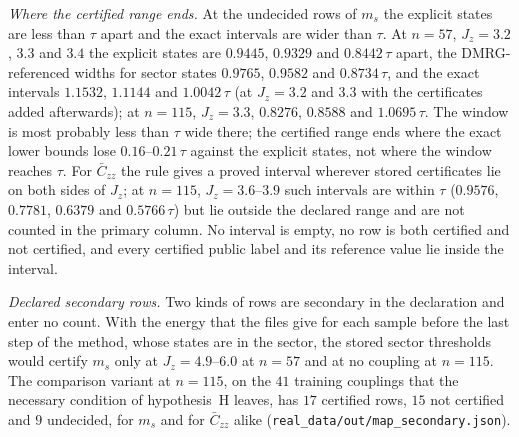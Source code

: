 \documentclass[aps,prx,onecolumn,10pt,nofootinbib,longbibliography,floatfix]{revtex4-2}
\theoremstyle{remark}
\newcommand{\Jz}{J_z}
\newcommand{\ms}{m_s}
\newcommand{\Czz}{\bar C_{zz}}
\begin{document}
\emph{Where the certified range ends.} At the undecided rows of $\ms$ the explicit states are less than $\tau$ apart
and the exact intervals are wider than $\tau$. At $n=57$, $\Jz=3.2$, $3.3$ and $3.4$ the explicit states %
are $0.9445$, $0.9329$ and $0.8442\,\tau$ apart, the DMRG-referenced widths for sector states $0.9765$, $0.9582$ and %
$0.8734\,\tau$, and the exact intervals $1.1532$, $1.1144$ and $1.0042\,\tau$ (at $\Jz=3.2$ and $3.3$ with the %
certificates added afterwards); at $n=115$, $\Jz=3.3$, $0.8276$, $0.8588$ and $1.0695\,\tau$. The window is most probably less %
than $\tau$ wide there; the certified range ends where the exact lower bounds lose $0.16$--$0.21\,\tau$ against the %
explicit states, not where the window reaches $\tau$.
For $\Czz$ the rule gives a proved interval wherever stored certificates lie on both sides of $\Jz$; at $n=115$,
$\Jz=3.6$--$3.9$ such intervals are within $\tau$ ($0.9576$, $0.7781$, $0.6379$ and $0.5766\,\tau$) but lie outside %
the declared range and are not counted in the primary column. No interval is empty, no row is both certified and
not certified, and every certified public label and its reference value lie inside the interval.

\emph{Declared secondary rows.} Two kinds of rows are secondary in the declaration and enter no count. With the
energy that the files give for each sample before the last step of the method, whose states are in the sector, the
stored sector thresholds would certify $\ms$ only at $\Jz=4.9$--$6.0$ at $n=57$ and at no coupling at $n=115$. %
The comparison variant at $n=115$, on the $41$ training couplings that the necessary condition of hypothesis~H leaves, has $17$ %
certified rows, $15$ not certified and $9$ undecided, for $\ms$ and for $\Czz$ alike %
(\texttt{real\_data/out/map\_secondary.json}).
\end{document}
